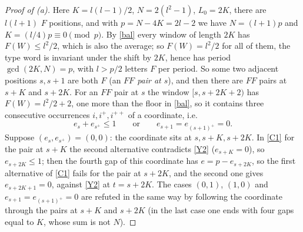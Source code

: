 \documentclass[11pt]{article}
\theoremstyle{remark}
\begin{document}
\begin{proof}[Proof of (a)]
Here $K=l(l-1)/2$, $N=2(l^2-1)$, $L_0=2K$, there are $l(l+1)$ $F$ positions, and with $p=N-4K=2l-2$ we have $N=(l+1)p$ and
$K=(l/4)p\equiv 0\pmod p$. By \eqref{bal} every window of length $2K$ has $F(W)\le l^2/2$, which is also the average; so
$F(W)=l^2/2$ for all of them, the type word is invariant under the shift by $2K$, hence has period $\gcd(2K,N)=p$, with $l>p/2$
letters $F$ per period. So some two adjacent positions $s,s+1$ are both $F$ (an \emph{$FF$ pair at $s$}), and then there are $FF$ pairs
at $s+K$ and $s+2K$. For an $FF$ pair at $s$ the window $[s,s+2K+2)$ has $F(W)=l^2/2+2$, one more than the floor in \eqref{bal},
so it contains three consecutive occurrences $i,i^+,i^{++}$ of a coordinate, i.e.
\begin{equation}\label{C1} e_s+e_{s^+}\le 1\qquad\text{or}\qquad e_{s+1}=e_{(s+1)^+}=0 . \end{equation}
Suppose $(e_s,e_{s^+})=(0,0)$: the coordinate sits at $s,s+K,s+2K$. In \eqref{C1} for the pair at $s+K$ the second alternative
contradicts \eqref{Y2} ($e_{s+K}=0$), so $e_{s+2K}\le 1$; then the fourth gap of this coordinate has $e=p-e_{s+2K}$, so the first
alternative of \eqref{C1} fails for the pair at $s+2K$, and the second one gives $e_{s+2K+1}=0$, against \eqref{Y2} at $t=s+2K$.
The cases $(0,1)$, $(1,0)$ and $e_{s+1}=e_{(s+1)^+}=0$ are refuted in the same way by following the coordinate through the pairs at
$s+K$ and $s+2K$ (in the last case one ends with four gaps equal to $K$, whose sum is not $N$).
\end{proof}
\end{document}
